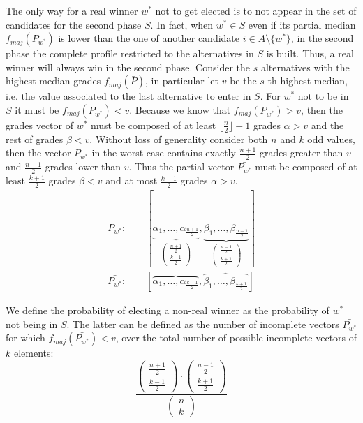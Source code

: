 \documentclass[version=3.21, pagesize, twoside=off, bibliography=totoc, DIV=calc, fontsize=12pt, a4paper]{scrartcl}
\begin{document}
The only way for a real winner $w^*$ not to get elected is to not appear in the set of candidates for the second phase $S$. In fact, when $w^*\in S$ even if its partial median $f_{maj}(\bar{P_{w^*}})$ is lower than the one of another candidate $i\in A\setminus\{w^*\}$, in the second phase the complete profile restricted to the alternatives in $S$ is built. Thus, a real winner will always win in the second phase. Consider the $s$ alternatives with the highest median grades $f_{maj}(\bar{P})$, in particular let $v$ be the $s$-th highest median, i.e. the value associated to the last alternative to enter in $S$. For $w^*$ not to be in $S$ it must be $f_{maj}(\bar{P_{w^*}})<v$. Because we know that $f_{maj}(P_{w^*})>v$, then the grades vector of $w^*$ must be composed of at least $\lfloor \frac{n}{2}\rfloor+1$ grades $\alpha>v$ and the rest of grades $\beta<v$. Without loss of generality consider both $n$ and $k$ odd values, then the vector $P_{w^*}$ in the worst case contains exactly $\frac{n+1}{2}$ grades greater than $v$ and $\frac{n-1}{2}$ grades lower than $v$. Thus the partial vector $\bar{P_{w^*}}$ must be composed of at least $\frac{k+1}{2}$ grades $\beta<v$ and at most $\frac{k-1}{2}$ grades $\alpha>v$.
\begin{align}
	P_{w^*}: \qquad [ \underbrace{\alpha_1, \dots , \alpha_{\frac{n+1}{2}}}_{\begin{pmatrix}\frac{n+1}{2} \\ \frac{k-1}{2}\end{pmatrix}}, \underbrace{\beta_1, \dots , \beta_{\frac{n-1}{2}}}_{\begin{pmatrix}\frac{n-1}{2} \\ {\frac{k+1}{2}}\end{pmatrix}} ] \\
	\bar{P_{w^*}}:\qquad [ \overbrace{\alpha_1, \dots , \alpha_{\frac{k-1}{2}}}, \overbrace{\beta_1, \dots , \beta_{\frac{k+1}{2}}}]
\end{align} 

We define the probability of electing a non-real winner as the probability of $w^*$ not being in $S$. The latter can be defined as the number of incomplete vectors $\bar{P_{w^*}}$ for which $f_{maj}(\bar{P_{w^*}})<v$, over the total number of possible incomplete vectors of $k$ elements:
\[ \frac{ \begin{pmatrix}\frac{n+1}{2} \\ {\frac{k-1}{2}}\end{pmatrix} \cdot \begin{pmatrix}\frac{n-1}{2} \\ {\frac{k+1}{2}}\end{pmatrix}}{\begin{pmatrix}n \\ k\end{pmatrix}}\]
\end{document}
